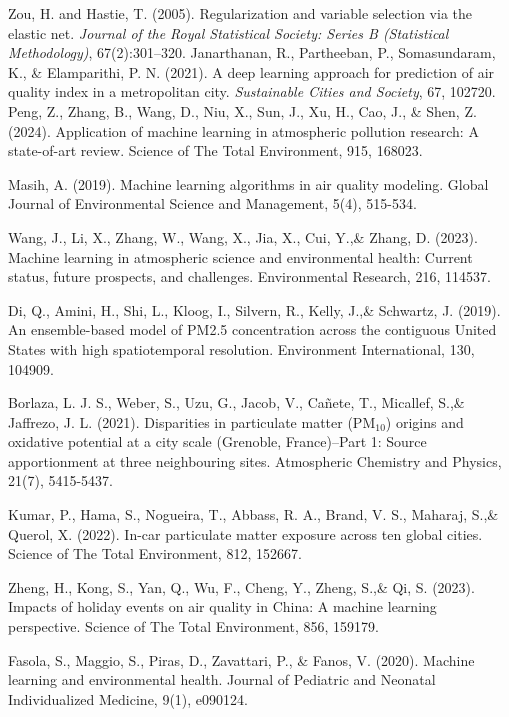 \documentclass{book}
\numberwithin{equation}{section}
\numberwithin{figure}{section}
\begin{document}
\begin{thebibliography}{99}
    Zou, H. and Hastie, T. (2005).
    \newblock Regularization and variable selection via the elastic net.
    \newblock \emph{Journal of the Royal Statistical Society: Series B (Statistical Methodology)}, 67(2):301--320.
    Janarthanan, R., Partheeban, P., Somasundaram, K., \& Elamparithi, P. N. (2021). A deep learning approach for prediction of air quality index in a metropolitan city. \textit{Sustainable Cities and Society}, 67, 102720.
    Peng, Z., Zhang, B., Wang, D., Niu, X., Sun, J., Xu, H., Cao, J., \& Shen, Z. (2024). Application of machine learning in atmospheric pollution research: A state-of-art review. Science of The Total Environment, 915, 168023.

    Masih, A. (2019). Machine learning algorithms in air quality modeling. Global Journal of Environmental Science and Management, 5(4), 515-534.

    Wang, J., Li, X., Zhang, W., Wang, X., Jia, X., Cui, Y.,\& Zhang, D. (2023). Machine learning in atmospheric science and environmental health: Current status, future prospects, and challenges. Environmental Research, 216, 114537.

    Di, Q., Amini, H., Shi, L., Kloog, I., Silvern, R., Kelly, J.,\& Schwartz, J. (2019). An ensemble-based model of PM2.5 concentration across the contiguous United States with high spatiotemporal resolution. Environment International, 130, 104909.

    Borlaza, L. J. S., Weber, S., Uzu, G., Jacob, V., Cañete, T., Micallef, S.,\& Jaffrezo, J. L. (2021). Disparities in particulate matter (PM$_{10}$) origins and oxidative potential at a city scale (Grenoble, France)–Part 1: Source apportionment at three neighbouring sites. Atmospheric Chemistry and Physics, 21(7), 5415-5437.

    Kumar, P., Hama, S., Nogueira, T., Abbass, R. A., Brand, V. S., Maharaj, S.,\& Querol, X. (2022). In-car particulate matter exposure across ten global cities. Science of The Total Environment, 812, 152667.

    Zheng, H., Kong, S., Yan, Q., Wu, F., Cheng, Y., Zheng, S.,\& Qi, S. (2023). Impacts of holiday events on air quality in China: A machine learning perspective. Science of The Total Environment, 856, 159179.

    Fasola, S., Maggio, S., Piras, D., Zavattari, P., \& Fanos, V. (2020). Machine learning and environmental health. Journal of Pediatric and Neonatal Individualized Medicine, 9(1), e090124.


\end{thebibliography}
\end{document}
